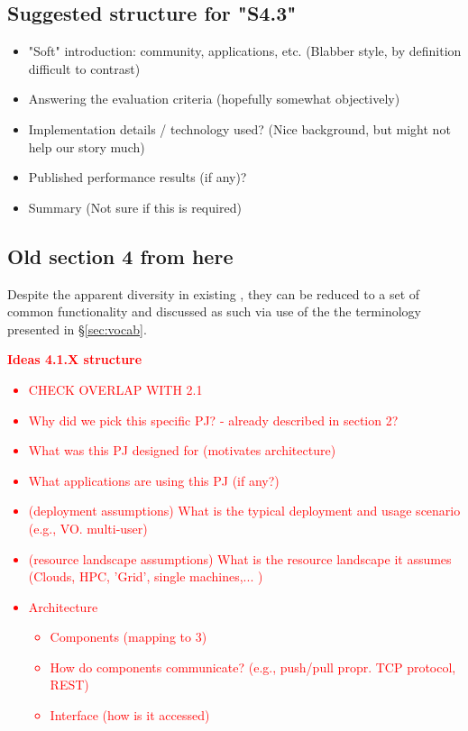 \documentclass{sig-alternate}
\begin{document}
\subsection{Suggested structure for "S4.3"}
\begin{itemize}

\item "Soft" introduction: community, applications, etc. (Blabber style, by
definition difficult to contrast)

\item Answering the evaluation criteria (hopefully somewhat objectively)

\item Implementation details / technology used? (Nice background, but might not
help our story much)

\item Published performance results (if any)?

\item Summary (Not sure if this is required)

\end{itemize}



\subsection{Old section 4 from here}


Despite the apparent diversity in existing \pilotjobs,
they can be reduced to a set of common functionality and
discussed as such via use of the the terminology presented
in \S\ref{sec:vocab}.


\textcolor{red}
{
\textbf{Ideas 4.1.X structure}
\begin{itemize}
\item CHECK OVERLAP WITH 2.1
\item Why did we pick this specific PJ? - already described in section 2?
\item What was this PJ designed for (motivates architecture)
\item What applications are using this PJ (if any?)
\item (deployment assumptions) What is the typical deployment and usage scenario (e.g., VO. multi-user)
\item (resource landscape assumptions) What is the resource landscape it assumes (Clouds, HPC, 'Grid', single machines,... )
\item Architecture
  \begin{itemize}
    \item Components (mapping to 3)
    \item How do components communicate? (e.g., push/pull propr. TCP protocol, REST)
    \item Interface (how is it accessed)
  \end{itemize}
\end{itemize}
}
\end{document}
